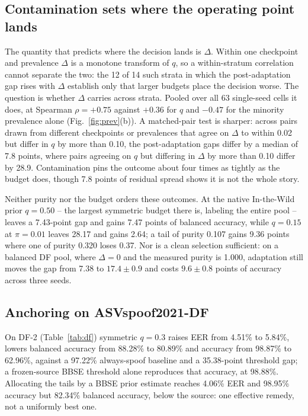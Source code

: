 \documentclass[10pt,letterpaper]{article}
\begin{document}
\subsection{Contamination sets where the operating point lands}
The quantity that predicts where the decision lands is $\Delta$. Within one
checkpoint and prevalence $\Delta$ is a monotone transform of $q$, so a
within-stratum correlation cannot separate the two: the 12 of 14 such strata in
which the post-adaptation gap rises with $\Delta$ establish only that larger
budgets place the decision worse. The question is whether $\Delta$ carries
across strata. Pooled over all 63 single-seed cells it does, at Spearman
$\rho=+0.75$ against $+0.36$ for $q$ and $-0.47$ for the minority prevalence
alone (Fig.~\ref{fig:prev}(b)). A matched-pair test is sharper: across pairs
drawn from different checkpoints or prevalences that agree on $\Delta$ to
within 0.02 but differ in $q$ by more than 0.10, the post-adaptation gaps
differ by a median of 7.8 points, where pairs agreeing on $q$ but differing in
$\Delta$ by more than 0.10 differ by 28.9. Contamination pins the outcome about
four times as tightly as the budget does, though 7.8 points of residual spread
shows it is not the whole story.

Neither purity nor the budget orders these outcomes. At the native In-the-Wild prior $q=0.50$ -- the
largest symmetric budget there is, labeling the entire pool -- leaves a
7.43-point gap and gains 7.47 points of balanced accuracy, while $q=0.15$ at
$\pi=0.01$ leaves 28.17 and gains 2.64; a tail of purity 0.107 gains 9.36
points where one of purity 0.320 loses 0.37. Nor is a clean selection
sufficient: on a balanced DF pool, where $\Delta=0$ and the measured purity is
1.000, adaptation still moves the gap from 7.38 to $17.4\pm0.9$ and costs
$9.6\pm0.8$ points of accuracy across three seeds.

\subsection{Anchoring on ASVspoof2021-DF}
On DF-2 (Table~\ref{tab:df}) symmetric $q=0.3$ raises EER from 4.51\% to
5.84\%, lowers balanced accuracy from 88.28\% to 80.89\% and accuracy from
98.87\% to 62.96\%, against a 97.22\% always-spoof baseline and a 35.38-point
threshold gap; a frozen-source BBSE threshold alone reproduces that accuracy,
at 98.88\%. Allocating the tails by a BBSE prior estimate reaches 4.06\% EER
and 98.95\% accuracy but 82.34\% balanced accuracy, below the source: one
effective remedy, not a uniformly best one.
\end{document}
